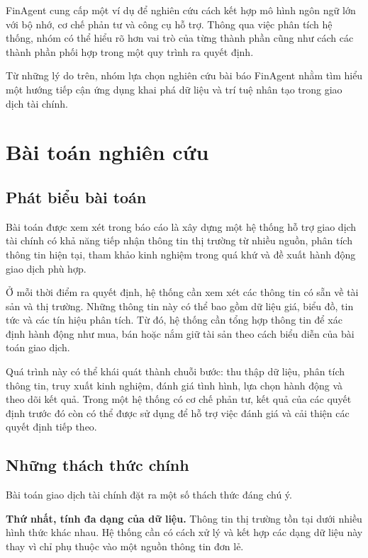FinAgent cung cấp một ví dụ để nghiên cứu cách kết hợp mô hình ngôn ngữ lớn với bộ nhớ, cơ chế phản tư và công cụ hỗ trợ. Thông qua việc phân tích hệ thống, nhóm có thể hiểu rõ hơn vai trò của từng thành phần cũng như cách các thành phần phối hợp trong một quy trình ra quyết định.

Từ những lý do trên, nhóm lựa chọn nghiên cứu bài báo FinAgent nhằm tìm hiểu một hướng tiếp cận ứng dụng khai phá dữ liệu và trí tuệ nhân tạo trong giao dịch tài chính.

\section{Bài toán nghiên cứu}

\subsection{Phát biểu bài toán}

Bài toán được xem xét trong báo cáo là xây dựng một hệ thống hỗ trợ giao dịch tài chính có khả năng tiếp nhận thông tin thị trường từ nhiều nguồn, phân tích thông tin hiện tại, tham khảo kinh nghiệm trong quá khứ và đề xuất hành động giao dịch phù hợp.

Ở mỗi thời điểm ra quyết định, hệ thống cần xem xét các thông tin có sẵn về tài sản và thị trường. Những thông tin này có thể bao gồm dữ liệu giá, biểu đồ, tin tức và các tín hiệu phân tích. Từ đó, hệ thống cần tổng hợp thông tin để xác định hành động như mua, bán hoặc nắm giữ tài sản theo cách biểu diễn của bài toán giao dịch.

Quá trình này có thể khái quát thành chuỗi bước: thu thập dữ liệu, phân tích thông tin, truy xuất kinh nghiệm, đánh giá tình hình, lựa chọn hành động và theo dõi kết quả. Trong một hệ thống có cơ chế phản tư, kết quả của các quyết định trước đó còn có thể được sử dụng để hỗ trợ việc đánh giá và cải thiện các quyết định tiếp theo.

\subsection{Những thách thức chính}

Bài toán giao dịch tài chính đặt ra một số thách thức đáng chú ý.

\textbf{Thứ nhất, tính đa dạng của dữ liệu.} Thông tin thị trường tồn tại dưới nhiều hình thức khác nhau. Hệ thống cần có cách xử lý và kết hợp các dạng dữ liệu này thay vì chỉ phụ thuộc vào một nguồn thông tin đơn lẻ.

